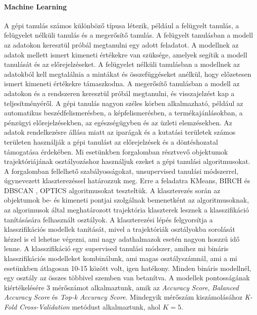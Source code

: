 \documentclass[acmtog, authorversion]{acmart}
\begin{document}
\paragraph{Machine Learning} A gépi tanulás számos különböző típusa létezik, például a felügyelt tanulás, a felügyelet nélküli tanulás és a megerősítő tanulás. A felügyelt tanulásban a modell az adatokon keresztül próbál megtanulni egy adott feladatot. A modellnek az adatok mellett ismert kimeneti értékekre van szüksége, amelyek segítik a modell tanulását és az előrejelzéseket. A felügyelet nélküli tanulásban a modellnek az adatokból kell megtalálnia a mintákat és összefüggéseket anélkül, hogy előzetesen ismert kimeneti értékekre támaszkodna. A megerősítő tanulásban a modell az adatokon és a rendszeren keresztül próbál megtanulni, és visszajelzést kap a teljesítményéről.
A gépi tanulás nagyon széles körben alkalmazható, például az automatikus beszédfelismerésben, a képfelismerésben, a termékajánlásokban, a pénzügyi előrejelzésekben, az egészségügyben és az üzleti elemzésekben. Az adatok rendelkezésre állása miatt az iparágak és a kutatási területek számos területen használják a gépi tanulást az előrejelzések és a döntéshozatal támogatása érdekében.
Mi esetünkben forgalomban résztvevő objektumok trajektóriájának osztályozáshoz használjuk ezeket a gépi tanulási algoritmusokat.
A forgalomban fellelhető szabályosságokat, unsupervised tanulási módszerrel, úgynevezett klaszterezéssel határozzuk meg. Erre a feladatra KMeans, BIRCH \cite{10.1145/233269.233324} és DBSCAN \cite{10.5555/3001460.3001507}\cite{10.1145/3068335}, OPTICS \cite{10.1145/304181.304187} algoritmusokat teszteltük.
A klaszterezés során az objektumok be- és kimeneti pontjai szolgálnak bemenetként az algoritmusoknak, az algorimusok által meghatározott trajektória klaszterek lesznek a klasszifikáció tanításására felhasznált osztályok. 
A klaszterezési lépés felgyorsítja a klasszifikációs modellek tanítását, mivel a trajektóriák osztályokba sorolását kézzel is el lehetne végezni, ami nagy adathalmazok esetén nagyon hoszzú idő lenne.
A klasszifikáció egy supervised tanulási módszer, amihez mi bináris klasszifikációs modelleket kombinálunk, ami magas osztályszámnál, ami a mi esetünkben átlagosan 10-15 között volt, igen hatékony. Minden bináris modellnél, egy osztály az összes többivel szemben van betanítva. A modellek pontosságának kiértékelésére 3 mérőszámot alkalmaztunk, amik az \emph{Accuracy Score}, \emph{Balanced Accuracy Score} \cite{10.1109/ICPR.2010.764} és \emph{Top-k Accuracy Score}.
Mindegyik mérőszám kiszámolásához \emph{K-Fold Cross-Validation} \cite{Anguita2012TheI} metódust alkalmaztunk, ahol \begin{math}K=5\end{math}.
\end{document}
